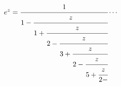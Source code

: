 \[e^{z}=\cfrac{1}{1-\cfrac{z}{1+\cfrac{z}{2-\cfrac{z}{3+\cfrac{z}{2-\cfrac{z}{5+%
\cfrac{z}{2-}}}}}}}\cdots\]